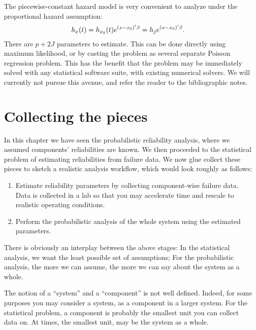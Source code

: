The piecewise-constant hazard model is very convenient to analyze under the proportional hazard assumption:
\begin{align}
	h_{x} (t) = h_{x_0} (t) e^{(x-x_0)'\beta} = h_j e^{(x-x_0)'\beta}.
\end{align}
There are $p+2J$ parameters to estimate.
This can be done directly using maximum likelihood, or by casting the problem as several separate Poisson regression problem. 
This has the benefit that the problem may be immediately solved with any statistical software suite, with existing numerical solvers.
We will currently not pursue this avenue, and refer the reader to the bibliographic notes.



\section{Collecting the pieces}
In this chapter we have seen the probabilistic reliability analysis, where we assumed components' reliabilities are known. 
We then proceeded to the statistical problem of estimating reliabilities from failure data.
We now glue collect these pieces to sketch a realistic analysis workflow, which would look roughly as follows:
\begin{enumerate}
\item Estimate reliability parameters by collecting component-wise failure data. Data is collected in a lab so that you may accelerate time and rescale to realistic operating conditions.
\item Perform the probabilistic analysis of the whole system using the estimated parameters.
\end{enumerate}


\begin{remark}
There is obviously an interplay between the above stages:
In the statistical analysis, we want the least possible set of assumptions;
For the probabilistic analysis, the more we can assume, the more we can say about the system as a whole.
\end{remark}



\begin{remark}
The notion of a ``system'' and a ``component'' is not well defined.
Indeed, for some purposes you may consider a system, as a component in a larger system.
For the statistical problem, a component is probably the smallest unit you can collect data on. At times, the smallest unit, may be the system as a whole.
\end{remark}





